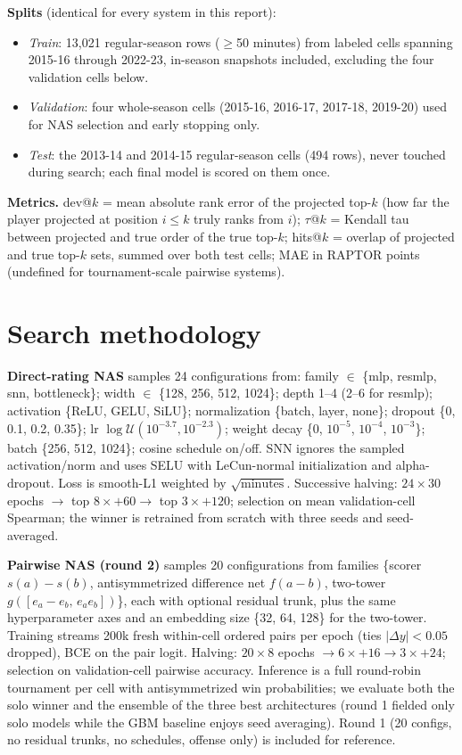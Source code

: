 \documentclass[10pt]{article}
\begin{document}
\textbf{Splits} (identical for every system in this report):
\begin{itemize}\itemsep0pt
\item \emph{Train}: 13{,}021 regular-season rows ($\geq$50 minutes) from
  labeled cells spanning 2015-16 through 2022-23, in-season snapshots
  included, excluding the four validation cells below.
\item \emph{Validation}: four whole-season cells (2015-16, 2016-17, 2017-18,
  2019-20) used for NAS selection and early stopping only.
\item \emph{Test}: the 2013-14 and 2014-15 regular-season cells (494 rows),
  never touched during search; each final model is scored on them once.
\end{itemize}
\textbf{Metrics.} dev@$k$ = mean absolute rank error of the projected top-$k$
(how far the player projected at position $i\le k$ truly ranks from $i$);
$\tau$@$k$ = Kendall tau between projected and true order of the true
top-$k$; hits@$k$ = overlap of projected and true top-$k$ sets, summed over
both test cells; MAE in RAPTOR points (undefined for tournament-scale
pairwise systems).

\section{Search methodology}
\textbf{Direct-rating NAS} samples 24 configurations from: family $\in$
\{mlp, resmlp, snn, bottleneck\}; width $\in$ \{128, 256, 512, 1024\}; depth
1--4 (2--6 for resmlp); activation \{ReLU, GELU, SiLU\}; normalization
\{batch, layer, none\}; dropout \{0, 0.1, 0.2, 0.35\}; lr
$\log\mathcal{U}(10^{-3.7},10^{-2.3})$; weight decay \{0, $10^{-5}$,
$10^{-4}$, $10^{-3}$\}; batch \{256, 512, 1024\}; cosine schedule on/off.
SNN ignores the sampled activation/norm and uses SELU with LeCun-normal
initialization and alpha-dropout. Loss is smooth-L1 weighted by
$\sqrt{\text{minutes}}$. Successive halving: $24 \times 30$ epochs
$\rightarrow$ top $8\times{+}60 \rightarrow$ top $3\times{+}120$; selection on
mean validation-cell Spearman; the winner is retrained from scratch with
three seeds and seed-averaged.

\textbf{Pairwise NAS (round 2)} samples 20 configurations from families
\{scorer $s(a)-s(b)$, antisymmetrized difference net $f(a-b)$, two-tower
$g([e_a-e_b,\,e_a e_b])$\}, each with optional residual trunk, plus the same
hyperparameter axes and an embedding size \{32, 64, 128\} for the two-tower.
Training streams 200k fresh within-cell ordered pairs per epoch (ties
$|\Delta y|<0.05$ dropped), BCE on the pair logit. Halving: $20\times 8$
epochs $\rightarrow 6\times{+}16 \rightarrow 3\times{+}24$; selection on
validation-cell pairwise accuracy. Inference is a full round-robin tournament
per cell with antisymmetrized win probabilities; we evaluate both the solo
winner and the ensemble of the three best architectures (round 1 fielded
only solo models while the GBM baseline enjoys seed averaging). Round 1
(20 configs, no residual trunks, no schedules, offense only) is included for
reference.
\end{document}
